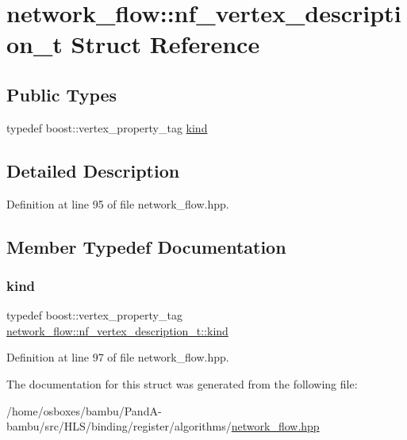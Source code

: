 \hypertarget{structnetwork__flow_1_1nf__vertex__description__t}{}\section{network\+\_\+flow\+:\+:nf\+\_\+vertex\+\_\+description\+\_\+t Struct Reference}
\label{structnetwork__flow_1_1nf__vertex__description__t}
\subsection*{Public Types}
\begin{DoxyCompactItemize}
\item 
typedef boost\+::vertex\+\_\+property\+\_\+tag \hyperlink{structnetwork__flow_1_1nf__vertex__description__t_add572dc5fd14cbe3c4644dc2a3ecc13e}{kind}
\end{DoxyCompactItemize}


\subsection{Detailed Description}


Definition at line 95 of file network\+\_\+flow.\+hpp.



\subsection{Member Typedef Documentation}
\mbox{\label{structnetwork__flow_1_1nf__vertex__description__t_add572dc5fd14cbe3c4644dc2a3ecc13e}} 
\subsubsection{\texorpdfstring{kind}{kind}}
{\footnotesize\ttfamily typedef boost\+::vertex\+\_\+property\+\_\+tag \hyperlink{structnetwork__flow_1_1nf__vertex__description__t_add572dc5fd14cbe3c4644dc2a3ecc13e}{network\+\_\+flow\+::nf\+\_\+vertex\+\_\+description\+\_\+t\+::kind}}



Definition at line 97 of file network\+\_\+flow.\+hpp.



The documentation for this struct was generated from the following file\+:\begin{DoxyCompactItemize}
\item 
/home/osboxes/bambu/\+Pand\+A-\/bambu/src/\+H\+L\+S/binding/register/algorithms/\hyperlink{network__flow_8hpp}{network\+\_\+flow.\+hpp}\end{DoxyCompactItemize}
